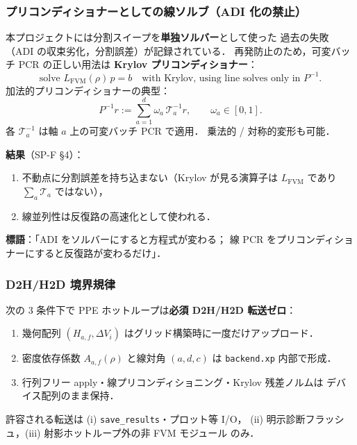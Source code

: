 \subsubsection{プリコンディショナーとしての線ソルブ（ADI 化の禁止）}
\label{sec:gpu_fvm_preconditioner}

本プロジェクトには分割スイープを\textbf{単独ソルバー}として使った
過去の失敗（ADI の収束劣化，分割誤差）が記録されている．
再発防止のため，可変バッチ PCR の正しい用法は
\textbf{Krylov プリコンディショナー}：
\begin{equation}
  \text{solve } L_\text{FVM}(\rho)\,p = b
  \quad\text{with Krylov, using line solves only in }P^{-1}.
  \label{eq:fvm_krylov_with_prec}
\end{equation}
加法的プリコンディショナーの典型：
\begin{equation}
  P^{-1} r := \sum_{a=1}^{d} \omega_a\,\mathcal{T}_a^{-1} r,
  \qquad \omega_a\in[0,1].
  \label{eq:fvm_additive_prec}
\end{equation}
各 $\mathcal{T}_a^{-1}$ は軸 $a$ 上の可変バッチ PCR で適用．
乗法的 / 対称的変形も可能．

\noindent\textbf{結果}（SP-F \cite{SPF} §4）：
\begin{enumerate}[noitemsep]
  \item 不動点に分割誤差を持ち込まない（Krylov が見る演算子は
        $L_\text{FVM}$ であり $\sum_a\mathcal{T}_a$ ではない），
  \item 線並列性は反復路の高速化として使われる．
\end{enumerate}
\textbf{標語}：「ADI をソルバーにすると方程式が変わる；
線 PCR をプリコンディショナーにすると反復路が変わるだけ」．

\subsubsection{D2H/H2D 境界規律}
\label{sec:gpu_fvm_d2h_discipline}

\begin{tcolorbox}[resultbox,title={ゼロ転送ホットループ条件（SP-F \cite{SPF} §5）}]
次の 3 条件下で PPE ホットループは\textbf{必須 D2H/H2D 転送ゼロ}：
\begin{enumerate}[noitemsep]
  \item 幾何配列 $(H_{a,f},\Delta V_i)$ はグリッド構築時に一度だけアップロード．
  \item 密度依存係数 $A_{a,f}(\rho)$ と線対角 $(a,d,c)$ は
        \texttt{backend.xp} 内部で形成．
  \item 行列フリー apply・線プリコンディショニング・Krylov 残差ノルムは
        デバイス配列のまま保持．
\end{enumerate}
\end{tcolorbox}
許容される転送は (i) \texttt{save\_results}・プロット等 I/O，
(ii) 明示診断フラッシュ，(iii) 射影ホットループ外の非 FVM モジュール
のみ．

